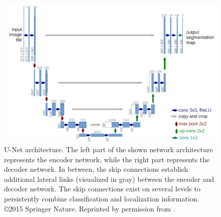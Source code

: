 \begin{figure}
	\includegraphics[width=\linewidth]{figures/chap223_unet.png}
	\caption[U-Net]{
		U-Net architecture. The left part of the shown network architecture represents the encoder network, while the right part represents the decoder network. 
		In between, the skip connections establish additional lateral links (visualized in gray) between the encoder and decoder network. 
		The skip connections exist on several levels to persistently combine classification and localization information. 
		\copyright 2015 Springer Nature. Reprinted by permission from \cite{RF15-U-Net}.}
	\label{fig:ch2:sec2:unet}
\end{figure}


